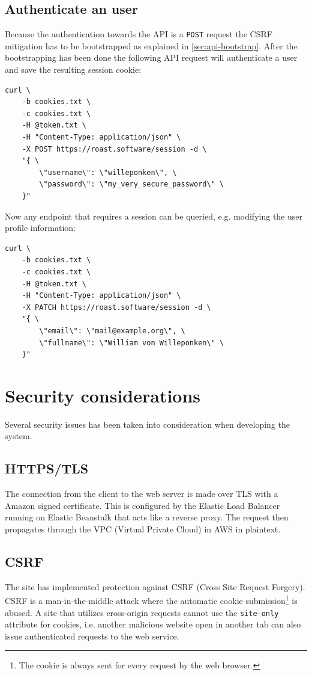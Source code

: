 \documentclass[12pt,a4paper]{report}
\begin{document}
\section{Authenticate an user}
Because the authentication towards the API is a \texttt{POST} request the CSRF mitigation has to be bootstrapped as explained in \autoref{sec:api-bootstrap}. After the bootstrapping has been done the following API request will authenticate a user and save the resulting session cookie:
\begin{verbatim}
curl \
    -b cookies.txt \
    -c cookies.txt \
    -H @token.txt \
    -H "Content-Type: application/json" \
    -X POST https://roast.software/session -d \
    "{ \
        \"username\": \"willeponken\", \
        \"password\": \"my_very_secure_password\" \
    }"
\end{verbatim}

Now any endpoint that requires a session can be queried, e.g. modifying the user profile information:
\begin{verbatim}
curl \
    -b cookies.txt \
    -c cookies.txt \
    -H @token.txt \
    -H "Content-Type: application/json" \
    -X PATCH https://roast.software/session -d \
    "{ \
        \"email\": \"mail@example.org\", \
        \"fullname\": \"William von Willeponken\" \
    }"
\end{verbatim}


\newpage

\chapter{Security considerations}
Several security issues has been taken into consideration when developing the system.

\section{HTTPS/TLS}
The connection from the client to the web server is made over TLS with a Amazon signed certificate.
This is configured by the Elastic Load Balancer running on Elastic Beanstalk that acts like a reverse proxy.
The request then propagates through the VPC (Virtual Private Cloud) in AWS in plaintext. 

\section{CSRF}
\label{subsec:csrf}
The site has implemented protection against CSRF (Cross Site Request Forgery). CSRF is a man-in-the-middle attack where the automatic cookie submission\footnote{The cookie is always sent for every request by the web browser.} is abused. A site that utilizes cross-origin requests cannot use the \texttt{site-only} attribute for cookies, i.e. another malicious website open in another tab can also issue authenticated requests to the web service\cite{rick}.
\end{document}
